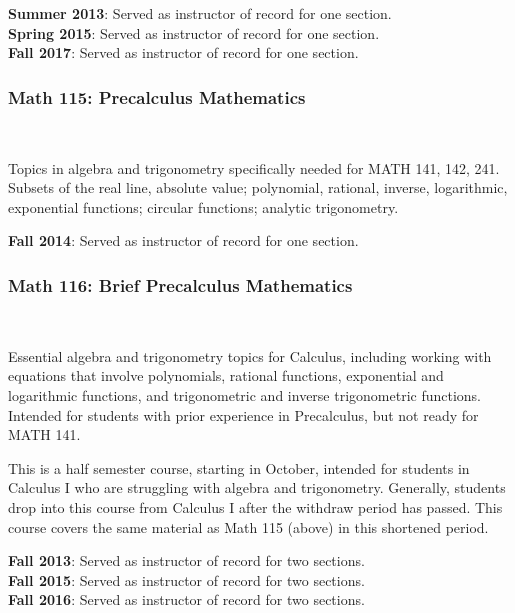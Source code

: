 \documentclass[teaching.portfolio.tex]{subfiles}
\begin{document}
\noindent
\textbf{Summer 2013}: Served as instructor of record for one section.\\
\textbf{Spring 2015}: Served as instructor of record for one section.\\
\textbf{Fall 2017}: Served as instructor of record for one section.

\subsubsection{Math 115: Precalculus Mathematics}\hfill\\
\begin{tcolorbox}
  \begin{desc}
    Topics in algebra and trigonometry specifically needed for MATH 141, 142, 241. Subsets of the real line, absolute value; polynomial, rational, inverse, logarithmic, exponential functions; circular functions; analytic trigonometry.
  \end{desc}
\end{tcolorbox}

\noindent
\textbf{Fall 2014}: Served as instructor of record for one section.

\subsubsection{Math 116: Brief Precalculus Mathematics}\hfill\\
\begin{tcolorbox}
  \begin{desc}
    Essential algebra and trigonometry topics for Calculus, including working with equations that involve polynomials, rational functions, exponential and logarithmic functions, and trigonometric and inverse trigonometric functions. Intended for students with prior experience in Precalculus, but not ready for MATH 141.
  \end{desc}
\end{tcolorbox}

\begin{rmk}
  This is a half semester course, starting in October, intended for students in Calculus I who are struggling with algebra and trigonometry.
Generally, students drop into this course from Calculus I after the withdraw period has passed.
This course covers the same material as Math 115 (above) in this shortened period.\\
\end{rmk}

\noindent
\textbf{Fall 2013}: Served as instructor of record for two sections.\\
\textbf{Fall 2015}: Served as instructor of record for two sections.\\
\textbf{Fall 2016}: Served as instructor of record for two sections.
\end{document}
